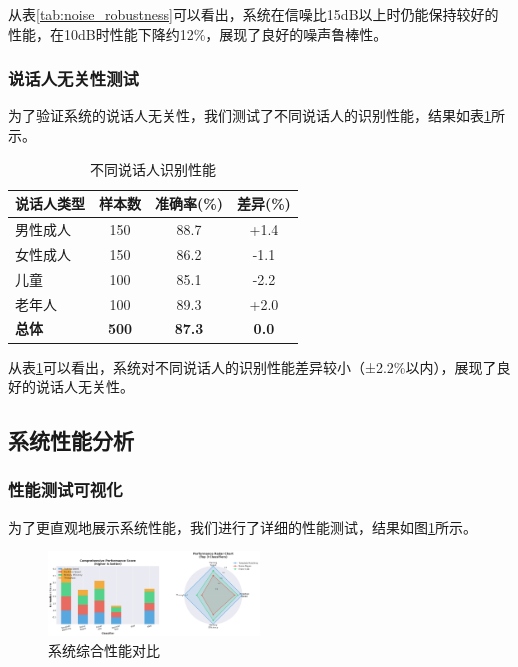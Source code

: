 \documentclass[sigconf,nonacm]{acmart}
\begin{document}
从表\ref{tab:noise_robustness}可以看出，系统在信噪比15dB以上时仍能保持较好的性能，在10dB时性能下降约12\%，展现了良好的噪声鲁棒性。

\subsubsection{说话人无关性测试}

为了验证系统的说话人无关性，我们测试了不同说话人的识别性能，结果如表\ref{tab:speaker_independence}所示。

\begin{table}[htbp]
\caption{不同说话人识别性能}
\label{tab:speaker_independence}
\begin{center}
\begin{tabular}{lccc}
\toprule
\textbf{说话人类型} & \textbf{样本数} & \textbf{准确率(\%)} & \textbf{差异(\%)} \\
\midrule
男性成人 & 150 & 88.7 & +1.4 \\
女性成人 & 150 & 86.2 & -1.1 \\
儿童 & 100 & 85.1 & -2.2 \\
老年人 & 100 & 89.3 & +2.0 \\
\midrule
\textbf{总体} & \textbf{500} & \textbf{87.3} & \textbf{0.0} \\
\bottomrule
\end{tabular}
\end{center}
\end{table}

从表\ref{tab:speaker_independence}可以看出，系统对不同说话人的识别性能差异较小（±2.2\%以内），展现了良好的说话人无关性。

\subsection{系统性能分析}

\subsubsection{性能测试可视化}

为了更直观地展示系统性能，我们进行了详细的性能测试，结果如图\ref{fig:performance_comprehensive}所示。

\begin{figure}[htbp]
\centering
\includegraphics[width=0.5\textwidth]{performance/comprehensive_performance.png}
\caption{系统综合性能对比}
\label{fig:performance_comprehensive}
\end{figure}
\end{document}
